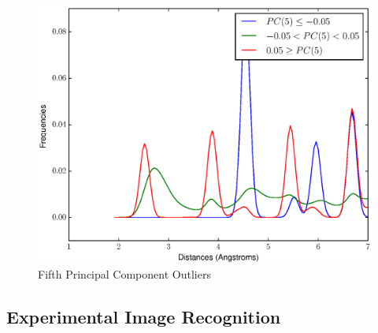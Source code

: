 \documentclass[12pt,letterpaper]{article}
\begin{document}
\begin{figure}[ht]
  \begin{center}
    \includegraphics[scale=0.8]{figs/eigenOutlier5.eps}
    \caption{Fifth Principal Component Outliers}
  \end{center}
\end{figure}
\clearpage

\subsection{Experimental Image Recognition}
\end{document}
